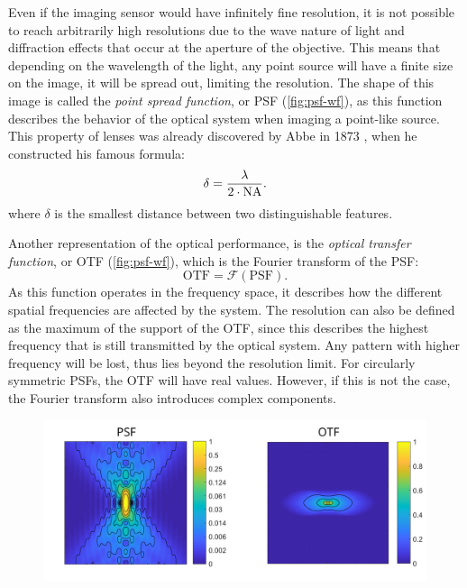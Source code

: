     Even if the imaging sensor would have infinitely fine resolution, it is not possible to reach arbitrarily high resolutions due to the wave nature of light and diffraction effects that occur at the aperture of the objective. This means that depending on the wavelength of the light, any point source will have a finite size on the image, it will be spread out, limiting the resolution. The shape of this image is called the \textit{point spread function}, or PSF (\autoref{fig:psf-wf}), as this function describes the behavior of the optical system when imaging a point-like source. This property of lenses was already discovered by Abbe in 1873 \cite{abbe_beitrage_1873}, when he constructed his famous formula:
    \begin{equation}
      \delta = \frac{\lambda}{2 \cdot \operatorname{NA}}.
      \label{eq:abbe}
    \end{equation}
    where $\delta$ is the smallest distance between two distinguishable features.

    Another representation of the optical performance, is the \textit{optical transfer function}, or OTF (\autoref{fig:psf-wf}), which is the Fourier transform of the PSF:
    \begin{equation}
      \text{OTF} = \mathcal{F}(\text{PSF}).
    \end{equation}
    As this function operates in the frequency space, it describes how the different spatial frequencies are affected by the system. The resolution can also be defined as the maximum of the support of the OTF, since this describes the highest frequency that is still transmitted by the optical system. Any pattern with higher frequency will be lost, thus lies beyond the resolution limit. For circularly symmetric PSFs, the OTF will have real values. However, if this is not the case, the Fourier transform also introduces complex components.

    \begin{figure}
      \centering
      \includegraphics[width=1\textwidth]{psfs/WF.pdf}
      \label{fig:psf-wf}
    \end{figure}


